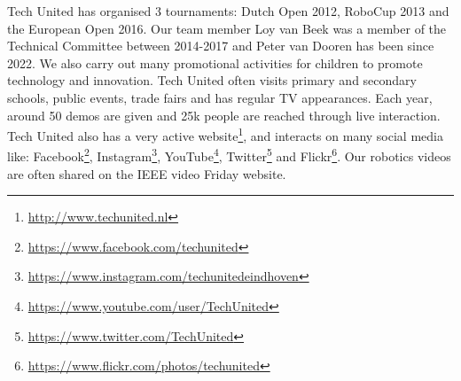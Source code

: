 Tech United has organised 3 tournaments: Dutch Open 2012, RoboCup 2013 and the European Open 2016. 
Our team member Loy van Beek was a member of the Technical Committee between 2014-2017 and Peter van Dooren has been since 2022.
We also carry out many promotional activities for children to promote technology and innovation. 
Tech United often visits primary and secondary schools, public events, trade fairs and has regular TV appearances. 
Each year, around 50 demos are given and 25k people are reached through live interaction.
Tech United also has a very active website\footnote{\url{http://www.techunited.nl}}, and interacts on many social media like: Facebook\footnote{\url{https://www.facebook.com/techunited}}, Instagram\footnote{\url{https://www.instagram.com/techunitedeindhoven}}, YouTube\footnote{\url{https://www.youtube.com/user/TechUnited}}, Twitter\footnote{\url{https://www.twitter.com/TechUnited}} and Flickr\footnote{\url{https://www.flickr.com/photos/techunited}}. Our robotics videos are often shared on the IEEE video Friday website.
